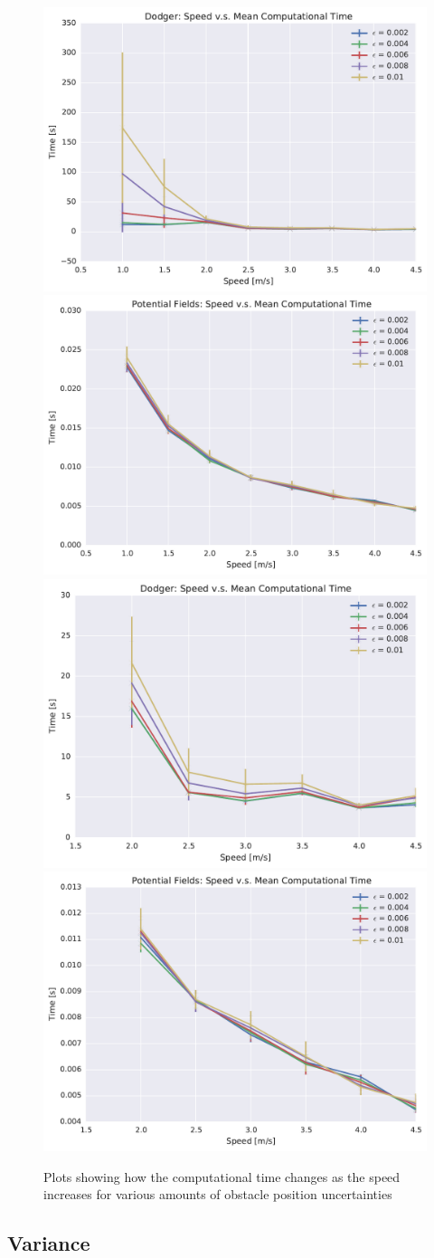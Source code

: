 \begin{figure}[h!]
    \centering
    \includegraphics[width=0.48\linewidth]{figs/planner_mean_times_0}
    \includegraphics[width=0.48\linewidth]{figs/pf_mean_times_0} \\
    \includegraphics[width=0.48\linewidth]{figs/planner_small_mean_times_0}
    \includegraphics[width=0.48\linewidth]{figs/pf_small_mean_times_0}
    \caption{Plots showing how the computational time changes as the speed
    increases for various amounts of obstacle position uncertainties}
    \label{fig:plot_comp_time}
\end{figure}

\subsection{Variance}

